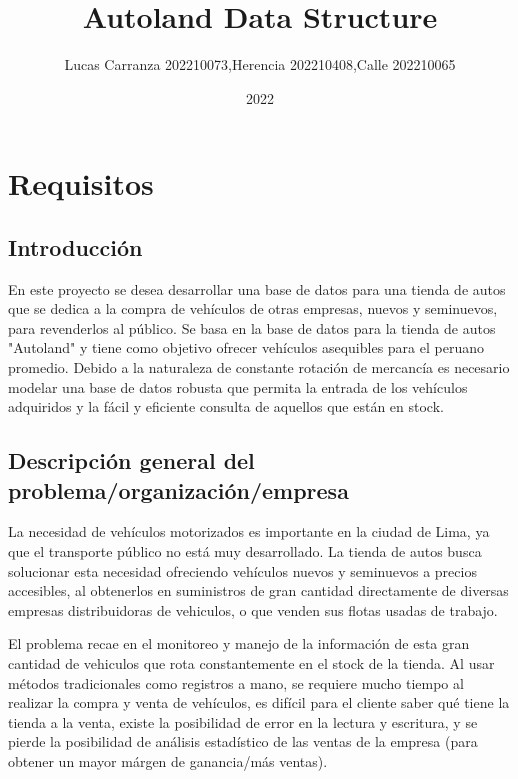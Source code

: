\documentclass[12pt]{article}
\begin{document}
\title{Autoland Data Structure}

\author{Lucas Carranza 202210073,\nDavid Herencia 202210408,\nFrancisco Calle 202210065}


\date{2022}

\maketitle


\tableofcontents

\newpage

\section{Requisitos}

\subsection{Introducci\'on}

En este proyecto se desea desarrollar una base de datos para una tienda de autos que se dedica a la compra de vehículos de otras empresas, nuevos y seminuevos, para revenderlos al público. Se basa en la base de datos para la tienda de autos "Autoland" y tiene como objetivo ofrecer vehículos asequibles para el peruano promedio. Debido a la naturaleza de constante rotación de mercancía es necesario modelar una base de datos robusta que permita la entrada de los vehículos adquiridos y la fácil y eficiente consulta de aquellos que están en stock. 

\subsection{Descripci\'on general del problema/organizaci\'on/empresa}

La necesidad de vehículos motorizados es importante en la ciudad de Lima, ya que el transporte público no está muy desarrollado. La tienda de autos busca solucionar esta necesidad ofreciendo vehículos nuevos y seminuevos a precios accesibles, al obtenerlos en suministros de gran cantidad directamente de diversas empresas distribuidoras de vehiculos, o que venden sus flotas usadas de trabajo.

El problema recae en el monitoreo y manejo de la información de esta gran cantidad de vehiculos que rota constantemente en el stock de la tienda. Al usar métodos tradicionales como registros a mano, se requiere mucho tiempo al realizar la compra y venta de vehículos, es difícil para el cliente saber qué tiene la tienda a la venta, existe la posibilidad de error en la lectura y escritura, y se pierde la posibilidad de análisis estadístico de las ventas de la empresa (para obtener un mayor márgen de ganancia/más ventas).
\end{document}
